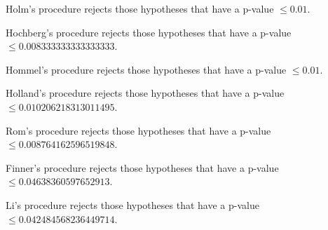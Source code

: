 \documentclass[a4paper,10pt]{article}
\begin{document}
\begin{landscape}
Holm's procedure rejects those hypotheses that have a p-value $\le0.01$.


Hochberg's procedure rejects those hypotheses that have a p-value $\le0.008333333333333333$.


Hommel's procedure rejects those hypotheses that have a p-value $\le0.01$.


Holland's procedure rejects those hypotheses that have a p-value $\le0.010206218313011495$.


Rom's procedure rejects those hypotheses that have a p-value $\le0.008764162596519848$.


Finner's procedure rejects those hypotheses that have a p-value $\le0.04638360597652913$.


Li's procedure rejects those hypotheses that have a p-value $\le0.042484568236449714$.



\newpage


\end{landscape}
\end{document}
